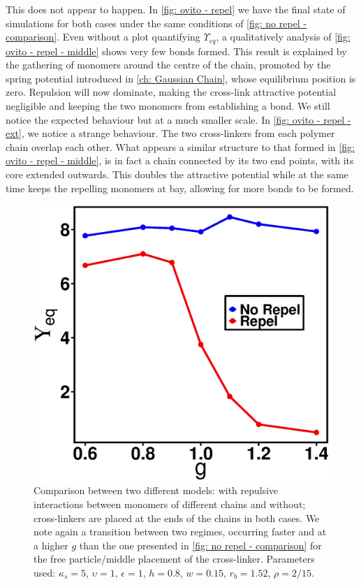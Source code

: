 \documentclass[../../main.tex]{subfiles}
\begin{document}
    This does not appear to happen. In \cref{fig: ovito - repel} we have the final state of simulations for both cases under the same conditions of \cref{fig: no repel - comparison}. Even without a plot quantifying $\Upsilon_{eq}$, a qualitatively analysis of \cref{fig: ovito - repel - middle} shows very few bonds formed. This result is explained by the gathering of monomers around the centre of the chain, promoted by the spring potential introduced in \cref{ch: Gaussian Chain}, whose equilibrium position is zero. Repulsion will now dominate, making the cross-link attractive potential negligible and keeping the two monomers from establishing a bond. We still notice the expected behaviour but at a much smaller scale. In \cref{fig: ovito - repel - ext}, we notice a strange behaviour. The two cross-linkers from each polymer chain overlap each other. What appears a similar structure to that formed in \cref{fig: ovito - repel - middle}, is in fact a chain connected by its two end points, with its core extended outwards. This doubles the attractive potential while at the same time keeps the repelling monomers at bay, allowing for more bonds to be formed.
    
        \begin{figure}[h]
            \centering
            \includegraphics[scale=0.40]{Figures/repel_vs_no.eps}
            \caption{Comparison between two different models: with repulsive interactions between monomers of different chains and without; cross-linkers are placed at the ends of the chains in both cases. We note again a transition between two regimes, occurring faster and at a higher $g$ than the one presented in \cref{fig: no repel - comparison} for the free particle/middle placement of the cross-linker. Parameters used: $\kappa_s = 5$, $\upsilon = 1$, $\epsilon = 1$, $h = 0.8$, $w = 0.15$, $r_b = 1.52$, $\rho = 2/15$.}
            \label{fig: no repel vs repel}
        \end{figure}
    
\end{document}
